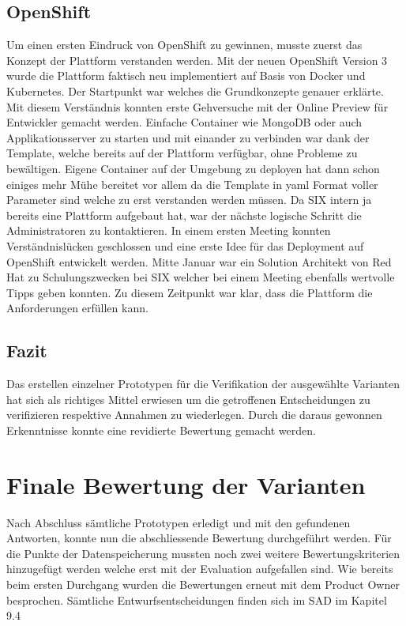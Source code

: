 \subsection{OpenShift}

Um einen ersten Eindruck von OpenShift zu gewinnen, musste zuerst das Konzept der Plattform verstanden werden. Mit der neuen OpenShift Version 3 wurde die Plattform faktisch neu implementiert auf Basis von Docker und Kubernetes. Der Startpunkt war \cite{openshiftintro} welches die Grundkonzepte genauer erklärte. Mit diesem Verständnis konnten erste Gehversuche mit der Online Preview für Entwickler gemacht werden. Einfache Container wie MongoDB oder auch Applikationsserver zu starten und mit einander zu verbinden war dank der Template, welche bereits auf der Plattform verfügbar, ohne Probleme zu bewältigen. Eigene Container auf der Umgebung zu deployen hat dann schon einiges mehr Mühe bereitet vor allem da die Template in yaml Format voller Parameter sind welche zu erst verstanden werden müssen. Da SIX intern ja bereits eine Plattform aufgebaut hat, war der nächste logische Schritt die Administratoren zu kontaktieren. In einem ersten Meeting konnten Verständnislücken geschlossen und eine erste Idee für das Deployment auf OpenShift entwickelt werden. Mitte Januar war ein Solution Architekt von Red Hat zu Schulungszwecken bei SIX welcher bei einem Meeting ebenfalls wertvolle Tipps geben konnten. Zu diesem Zeitpunkt war klar, dass die Plattform die Anforderungen erfüllen kann.

\subsection{Fazit}

Das erstellen einzelner Prototypen für die Verifikation der ausgewählte Varianten hat sich als richtiges Mittel erwiesen um die getroffenen Entscheidungen zu verifizieren respektive Annahmen zu wiederlegen. Durch die daraus gewonnen Erkenntnisse konnte eine revidierte Bewertung gemacht werden.

\newpage

\section{Finale Bewertung der Varianten}

Nach Abschluss sämtliche Prototypen erledigt und mit den gefundenen Antworten, konnte nun die abschliessende Bewertung durchgeführt werden. Für die Punkte der Datenspeicherung mussten noch zwei weitere Bewertungskriterien hinzugefügt werden welche erst mit der Evaluation aufgefallen sind. Wie bereits beim ersten Durchgang wurden die Bewertungen erneut mit dem Product Owner besprochen. Sämtliche Entwurfsentscheidungen finden sich im SAD im Kapitel 9.4

